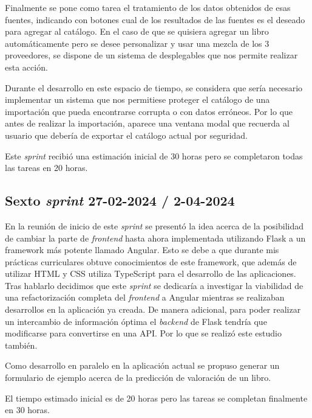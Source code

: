 Finalmente se pone como tarea el tratamiento de los datos obtenidos de esas fuentes, indicando con botones cual de los resultados de las fuentes es el deseado para agregar al catálogo.
En el caso de que se quisiera agregar un libro automáticamente pero se desee personalizar y usar una mezcla de los 3 proveedores, se dispone de un sistema de desplegables que nos permite realizar esta acción.

Durante el desarrollo en este espacio de tiempo, se considera que sería necesario implementar un sistema que nos permitiese proteger el catálogo de una importación que pueda encontrarse corrupta o con datos erróneos.
Por lo que antes de realizar la importación, aparece una ventana modal que recuerda al usuario que debería de exportar el catálogo actual por seguridad.

Este \textit{sprint} recibió una estimación inicial de 30 horas pero se completaron todas las tareas en 20 horas.

\subsection{Sexto \textit{sprint} 27-02-2024 / 2-04-2024}
En la reunión de inicio de este \textit{sprint} se presentó la idea acerca de la posibilidad de cambiar la parte de \textit{frontend} hasta ahora implementada utilizando Flask a un framework más potente llamado Angular. Esto se debe a que durante mis prácticas curriculares obtuve conocimientos de este framework, que además de utilizar HTML y CSS utiliza TypeScript para el desarrollo de las aplicaciones.
Tras hablarlo decidimos que este \textit{sprint} se dedicaría a investigar la viabilidad de una refactorización completa del \textit{frontend} a Angular mientras se realizaban desarrollos en la aplicación ya creada. 
De manera adicional, para poder realizar un intercambio de información óptima el \textit{backend} de Flask tendría que modificarse para convertirse en una API. Por lo que se realizó este estudio también.

Como desarrollo en paralelo en la aplicación actual se propuso generar un formulario de ejemplo acerca de la predicción de valoración de un libro.

El tiempo estimado inicial es de 20 horas pero las tareas se completan finalmente en 30 horas.

